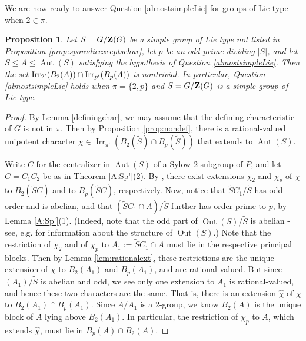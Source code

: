 \documentclass[12pt,leqno,a4paper]{amsart}
\newcommand{\Irr}{{\operatorname{Irr}}}
\newcommand{\Out}{{\operatorname{Out}}}
\newcommand{\out}{{\operatorname{Out}}}
\def\zent#1{{\bf Z}(#1)}
\def\irrp#1#2{{\rm Irr}_{#1'}(#2)}
\newtheorem{prop}[thm]{Proposition}
\theoremstyle{remark}
\newcommand\wt[1]{\widetilde{#1}}
\newcommand{\aut}{\operatorname{Aut}}
\begin{document}
We are now ready to answer Question \ref{almostsimpleLie} for groups of Lie type when $2\in\pi$.



\begin{prop}\label{lietype}
Let $S=G/\zent{G}$ be a simple group of Lie type not listed in Proposition \ref{prop:sporadicexceptschur}, let $p$ be an odd prime dividing $|S|$, and let $S\leq A\leq \aut(S)$ satisfying the hypothesis of Question \ref{almostsimpleLie}.  Then the set $\irrp{2}{B_2(A)}\cap\irrp{p}{B_p(A)}$ is nontrivial. In particular, Question \ref{almostsimpleLie} holds when $\pi=\{2,p\}$ and $S=G/\zent{G}$ is a simple group of Lie type. 
\end{prop}



\begin{proof}
By Lemma \ref{definingchar}, we may assume that the defining characteristic of $G$ is not in $\pi$.  Then by Proposition \ref{prop:nondef}, there is a rational-valued unipotent character $\chi\in\Irr_{\pi'}(B_2(\wt S)\cap B_p(\wt S))$ that extends to $\aut(S)$.  

Write $C$ for the centralizer in $\aut(S)$ of a Sylow $2$-subgroup of $P$, and let $C=C_1C_2$ be as in Theorem \ref{A:Sp'}(2). By \cite[Lemma 3.3]{GMS22}, there exist extensions $\chi_2$ and $\chi_p$ of $\chi$ to $B_2(\wt{S}C)$ and to $B_p(\wt{S}C)$, respectively.   
Now, notice that $\wt{S}C_1/\wt{S}$ has odd order and is abelian, and that $(\wt{S}C_1\cap A)/\wt{S}$ further has order prime to $p$, by Lemma \ref{A:Sp'}(1). (Indeed, note that the odd part of $\Out(S)/\wt{S}$ is abelian - see, e.g. \cite[Theorems 2.5.12-2.5.14]{GLS3} for information about the structure of $\out(S)$.) Note that the restriction of $\chi_2$ and of $\chi_p$ to $A_1:=\wt{S}C_1\cap A$ must lie in the respective principal blocks.  Then by Lemma \ref{lem:rationalext}, these restrictions are the unique extension of $\chi$ to $B_2(A_1)$ and $B_p(A_1)$, and are rational-valued.  But since $(A_1)/\wt{S}$ is abelian and odd, we see only one extension to $A_1$ is rational-valued, and hence these two characters are the same.  That is, there is an extension $\hat\chi$ of $\chi$ to $B_2(A_1)\cap B_p(A_1)$. Since $A/A_1$ is a $2$-group, we know $B_2(A)$ is the unique block of $A$ lying above $B_2(A_1)$. In particular, the restriction of $\chi_p$ to $A$, which extends $\hat\chi$, must lie in $B_p(A)\cap B_2(A)$.
\end{proof}
\end{document}

